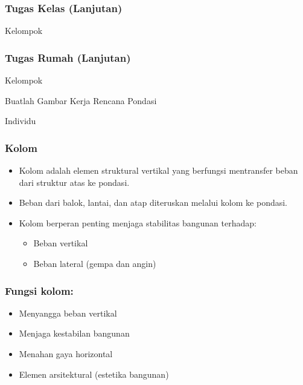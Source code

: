 \documentclass[../main.tex]{subfiles}
\begin{document}
\begin{frame}[mytitle=center,t,mycolor=digiPH_gray,light]
	\frametitle{Tugas Kelas (Lanjutan)}

	\footnotesize Kelompok

\end{frame}


\begin{frame}[mytitle=center,t,mycolor=digiPH_gray,light]
	\frametitle{Tugas Rumah (Lanjutan)}

	\footnotesize Kelompok

	Buatlah Gambar Kerja \Huge Rencana Pondasi \normalsize

	\footnotesize Individu

\end{frame}

\begin{frame}[mytitle=center,t,mycolor=digiPH_gray,light]
	\frametitle{Kolom}

	\begin{itemize}
		\item Kolom adalah elemen struktural vertikal yang berfungsi mentransfer beban dari struktur atas ke pondasi.
		\item Beban dari balok, lantai, dan atap diteruskan melalui kolom ke pondasi.
		\item Kolom berperan penting menjaga stabilitas bangunan terhadap:
		      \begin{itemize}
			      \item Beban vertikal
			      \item Beban lateral (gempa dan angin)
		      \end{itemize}
	\end{itemize}

\end{frame}


\begin{frame}[mytitle=standard,t,mycolor=digiPH_ubcblue,dark]
	\frametitle{Fungsi kolom:}
	\begin{itemize}
		\item Menyangga beban vertikal
		\item Menjaga kestabilan bangunan
		\item Menahan gaya horizontal
		\item Elemen arsitektural (estetika bangunan)
	\end{itemize}
\end{frame}
\end{document}
